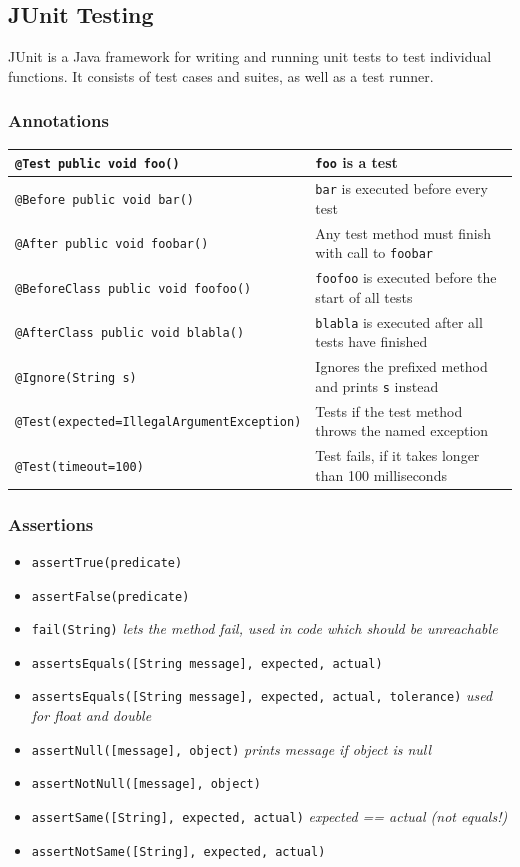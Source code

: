 \subsection{JUnit Testing}
JUnit is a Java framework for writing and running unit tests to test individual functions.
It consists of test cases and suites, as well as a test runner.


\subsubsection*{Annotations}
\renewcommand{\arraystretch}{1.4}
\begin{tabular}{ll}
	\texttt{@Test public void foo()} & \texttt{foo} is a test \\ \hline
	\texttt{@Before public void bar()} & \texttt{bar} is executed before every test \\ \hline
	\texttt{@After public void foobar()} & Any test method must finish with call to \texttt{foobar} \\ \hline
	\texttt{@BeforeClass public void foofoo()} & \texttt{foofoo} is executed before the start of all tests \\ \hline
	\texttt{@AfterClass public void blabla()} & \texttt{blabla} is executed after all tests have finished \\ \hline
	\texttt{@Ignore(String s)} & Ignores the prefixed method and prints \texttt{s} instead \\ \hline
	\texttt{@Test(expected=IllegalArgumentException)} & Tests if the test method throws the named exception \\ \hline
	\texttt{@Test(timeout=100)} & Test fails, if it takes longer than 100 milliseconds
\end{tabular}
\renewcommand{\arraystretch}{1}

\subsubsection*{Assertions}
\begin{itemize}[]
  \item \texttt{assertTrue(predicate)}
  \item \texttt{assertFalse(predicate)}
  \item \texttt{fail(String)} \textit{lets the method fail, used in code which should be unreachable}
  \item \texttt{assertsEquals([String message], expected, actual)}
  \item \texttt{assertsEquals([String message], expected, actual, tolerance)} \textit{used for float and double}
  \item \texttt{assertNull([message], object)} \textit{prints message if object is null}
  \item \texttt{assertNotNull([message], object)}
  \item \texttt{assertSame([String], expected, actual)} \textit{expected == actual (not equals!)}
  \item \texttt{assertNotSame([String], expected, actual)}
\end{itemize}
\newpage

